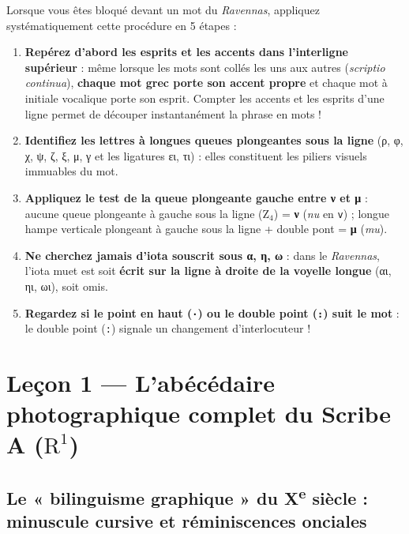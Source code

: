 \documentclass[11pt,a4paper]{article}
\begin{document}
Lorsque vous êtes bloqué devant un mot du \textit{Ravennas}, appliquez systématiquement cette procédure en 5 étapes :
\begin{enumerate}
    \item \textbf{Repérez d'abord les esprits et les accents dans l'interligne supérieur} : même lorsque les mots sont collés les uns aux autres (\textit{scriptio continua}), \textbf{chaque mot grec porte son accent propre} et chaque mot à initiale vocalique porte son esprit. Compter les accents et les esprits d'une ligne permet de découper instantanément la phrase en mots !
    \item \textbf{Identifiez les lettres à longues queues plongeantes sous la ligne} (ρ, φ, χ, ψ, ζ, ξ, μ, γ et les ligatures ει, τι) : elles constituent les piliers visuels immuables du mot.
    \item \textbf{Appliquez le test de la queue plongeante gauche entre ν et μ} : aucune queue plongeante à gauche sous la ligne ($\text{Z}_4$) = \textbf{ν} (\textit{nu} en \texttt{v}) ; longue hampe verticale plongeant à gauche sous la ligne + double pont = \textbf{μ} (\textit{mu}).
    \item \textbf{Ne cherchez jamais d'iota souscrit sous α, η, ω} : dans le \textit{Ravennas}, l'iota muet est soit \textbf{écrit sur la ligne à droite de la voyelle longue} (αι, ηι, ωι), soit omis.
    \item \textbf{Regardez si le point en haut (\texttt{·}) ou le double point (\texttt{:}) suit le mot} : le double point (\texttt{:}) signale un changement d'interlocuteur !
\end{enumerate}

\newpage
\section{Leçon 1 — L'abécédaire photographique complet du Scribe A ($\text{R}^1$)}

\subsection{Le « bilinguisme graphique » du X\textsuperscript{e} siècle : minuscule cursive et réminiscences onciales}
\end{document}
